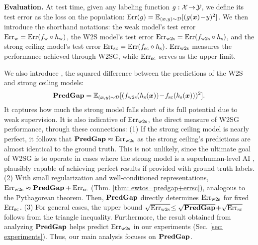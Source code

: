 


\textbf{Evaluation.} At test time, given any labeling function $g:{\mathcal{X}}\!\rightarrow\!{\mathcal{Y}}$, we define its test error as the loss on the population: $
    \text{Err}(g) = \mathbb{E}_{({\bm{x}}, y)\sim{\mathcal{D}}}[ ( g({\bm{x}})\!-\! y )^2 ]$. We then introduce the shorthand notations: the weak model's test error $\text{Err}_{\text{w}}=\text{Err}(f_{\text{w}} \circ h_{\text{w}} )$, the W2S model's test error $ \text{Err}_{\text{w2s}}=\text{Err}(f_{\text{w2s}} \circ h_{\text{s}} )$, and the strong ceiling model's test error  $ \text{Err}_{\text{sc}}=\text{Err}(f_{\text{sc}} \circ h_{\text{s}} )$. $\text{Err}_{\text{w2s}}$ measures the performance achieved through W2SG, while $\text{Err}_{\text{sc}}$ serves as the upper limit.

We also introduce \predgap{}, the squared difference between the predictions of the W2S and strong ceiling models: 
$$
    \textbf{PredGap} = \mathbb{E}_{({\bm{x}}, y)\sim{\mathcal{D}}}[ ( f_{\text{w2s}}(h_{\text{s}}({\bm{x}}))\!-\! f_{\text{sc}}(h_{\text{s}}({\bm{x}})) )^2 ].
$$
{It captures how much the strong model falls short of its full potential due to weak supervision.} 
It is also indicative of \(\text{Err}_{\text{w2s}}\), the direct measure of W2SG performance, through these connections: (1) If the strong ceiling model is nearly perfect, it follows that $\textbf{PredGap}{}\approx \text{Err}_{\text{w2s}} $ {as the strong ceiling's predictions are almost identical to the ground truth}. This is not unlikely, since the ultimate goal of W2SG is to operate in cases where the strong model is a superhuman-level AI \cite{burns2023weak}, plausibly capable of achieving perfect results if provided with ground truth labels. (2) With small regularization and well-conditioned representations, $\text{Err}_{\text{w2s}} \approx \textbf{PredGap}{}+ \text{Err}_{\text{sc}} $ (Thm. \ref{thm: ewtos=predgap+errsc}), analogous to the Pythagorean theorem. Then, $\textbf{PredGap}{}$ directly determines $\text{Err}_{\text{w2s}}$ for fixed $\text{Err}_{\text{sc}}$. (3) For general cases, the upper bound $ \sqrt{\text{Err}_{\text{w2s}}}\! \leq \sqrt{\textbf{PredGap}{}}\! +\! \sqrt{\text{Err}_{\text{sc}}}  $ follows from the triangle inequality. Furthermore, the result obtained from analyzing $\textbf{PredGap}{}$ helps predict $\text{Err}_{\text{w2s}}$ in our experiments (Sec. \ref{sec: experiments}). Thus, our main analysis focuses on $\textbf{PredGap}{}$.

